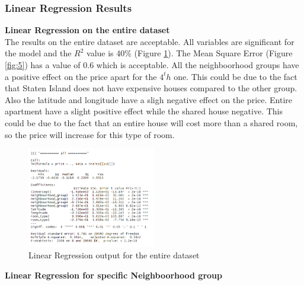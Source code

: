 \documentclass{FR16}
\begin{document}
\newpage
\subsubsection{Linear Regression Results}

\textbf{Linear Regression on the entire dataset}\\
\noindent The results on the entire dataset are acceptable. All variables are significant for the model and the $R^2$ value is 40\% (Figure \ref{fig:6}).
The Mean Square Error (Figure \ref{fig:5}) has a value of 0.6 which is acceptable. All the neighboorhood groups have a positive effect on the price apart for the $4^th$ one. This could be due to the fact that Staten Island does not have expensive houses compared to the other group. \\
Also the latitude and longitude have a sligh negative effect on the price. Entire apartment have a slight positive effect while the shared house negative. This could be due to the fact that an entire house will cost more than a shared room, so the price will increase for this type of room. 

\begin{figure}[H]
\centering
\includegraphics[width=0.5\textwidth]{figures/lm1.PNG} 
\caption{\label{fig:6} Linear Regression output for the entire dataset}
\end{figure}
\noindent
\textbf{Linear Regression for specific Neighboorhood group}
\end{document}

